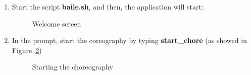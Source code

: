 \documentclass{article}	%
\begin{document}
\begin{enumerate}
 \item Start the script \textbf{baile.sh}, and then, the application will start:

  \begin{figure}[htbp]
  \centering
  \setlength\fboxrule{1.0pt}
  \caption{Welcome screen}
  \label{welcome-screen}
  \end{figure}

  \item  In the prompt, start the coreography by typing \textbf{start\_chore} (as showed in Figure~\ref{chore})
  
  \begin{figure}[htbp]
  \centering
  \setlength\fboxrule{1.0pt}
  \caption{Starting the choreography}
  \label{chore}
  \end{figure}


\end{enumerate}
\end{document}
